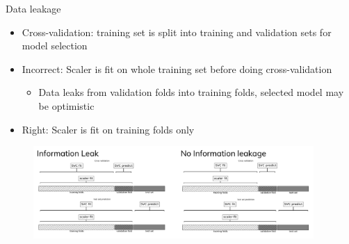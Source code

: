 \begin{frame}{Data leakage}
    \begin{itemize}
        \item Cross-validation: training set is split into training and validation sets for model selection
        \item Incorrect: Scaler is fit on whole training set before doing cross-validation
        \begin{itemize}
            \item Data leaks from validation folds into training folds, selected model may be optimistic
        \end{itemize}
        \item Right: Scaler is fit on training folds only
    \end{itemize}

    \begin{figure}
        \centering
        \includegraphics[width=0.95\textwidth,keepaspectratio]{images/pre-processing/infoleak.png}
    \end{figure}
\end{frame}

